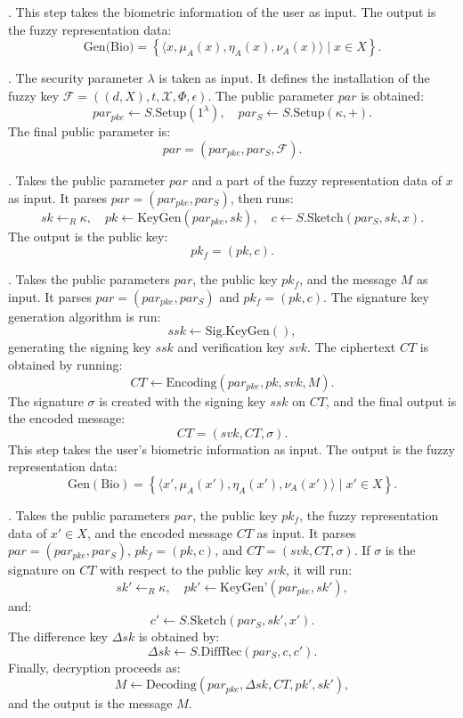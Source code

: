 \documentclass[graybox]{svmult}
\begin{document}
   . This step takes the biometric information of the user as input. The output is the fuzzy representation data:
          \[
              \text{Gen(Bio)} = \left\{ \langle x, \mu_A(x), \eta_A(x), \nu_A(x) \rangle \mid x \in X \right\}.
          \]

    . The security parameter $\lambda$ is taken as input. It defines the installation of the fuzzy key $\mathcal{F} = ((d, X), t, \mathcal{X}, \Phi, \epsilon)$. The public parameter $par$ is obtained:
          \[
              par_{pke} \leftarrow S.\text{Setup}(1^\lambda), \quad par_S \leftarrow S.\text{Setup}(\kappa, +).
          \]
          The final public parameter is:
          \[
              par = (par_{pke}, par_S, \mathcal{F}).
          \]

   . Takes the public parameter $par$ and a part of the fuzzy representation data of $x$ as input. It parses $par = (par_{pke}, par_S)$, then runs:
          \[
              sk \leftarrow_R \kappa, \quad pk \leftarrow \text{KeyGen}(par_{pke}, sk), \quad c \leftarrow S.\text{Sketch}(par_S, sk, x).
          \]
          The output is the public key:
          \[
              pk_f = (pk, c).
          \]

    . Takes the public parameters $par$, the public key $pk_f$, and the message $M$ as input. It parses $par = (par_{pke}, par_S)$ and $pk_f = (pk, c)$. The signature key generation algorithm is run:
          \[
              ssk \leftarrow \text{Sig.KeyGen}(),
          \]
          generating the signing key $ssk$ and verification key $svk$. The ciphertext $CT$ is obtained by running:
          \[
              CT \leftarrow \text{Encoding}(par_{pke}, pk, svk, M).
          \]
          The signature $\sigma$ is created with the signing key $ssk$ on $CT$, and the final output is the encoded message:
          \[
              CT = (svk, CT, \sigma).
          \]
     This step takes the user's biometric information as input. The output is the fuzzy representation data:
         \[
          \text{Gen}(\text{Bio}) = \left\{ \langle x', \mu_A(x'), \eta_A(x'), \nu_A(x') \rangle \mid x' \in X \right\}.
         \]
    

    . Takes the public parameters $par$, the public key $pk_f$, the fuzzy representation data of $x' \in X$, and the encoded message $CT$ as input. It parses $par = (par_{pke}, par_S)$, $pk_f = (pk, c)$, and $CT = (svk, CT, \sigma)$. If $\sigma$ is the signature on $CT$ with respect to the public key $svk$, it will run:
          \[
              sk' \leftarrow_R \kappa, \quad pk' \leftarrow \text{KeyGen'}(par_{pke}, sk'),
          \]
          and:
          \[
              c' \leftarrow S.\text{Sketch}(par_S, sk', x').
          \]
          The difference key $\Delta sk$ is obtained by:
          \[
              \Delta sk \leftarrow S.\text{DiffRec}(par_S, c, c').
          \]
          Finally, decryption proceeds as:
          \[
              M \leftarrow \text{Decoding}(par_{pke}, \Delta sk, CT, pk', sk'),
          \]
          and the output is the message $M$.
\end{document}
